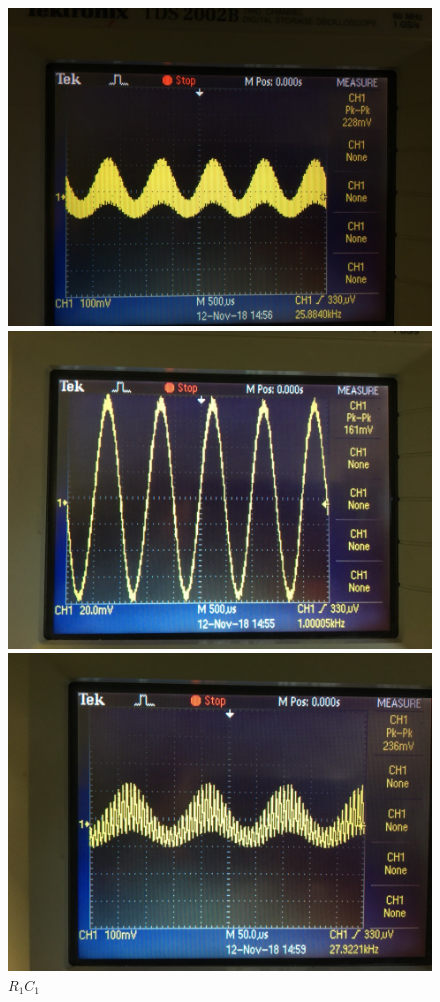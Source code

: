 \begin{figure}[H]
	\centering
	\begin{minipage}{0.32\linewidth}
		\centering
		\includegraphics[width=0.9\linewidth]{photo/1kHztau1.jpg}
		\caption*{$R_1C_1$}
	
		\centering
		\includegraphics[width=0.9\linewidth]{photo/1kHztau2.jpg}
		\caption*{$R_2C_2$}
		\caption*{$F_\text{M}=1\text{кГц}$}
	\end{minipage}
	\begin{minipage}{0.32\linewidth}
		\centering
		\includegraphics[width=0.9\linewidth]{photo/7kHztau1.jpg}
		\caption*{$R_1C_1$}
	

\end{minipage}
\end{figure}
